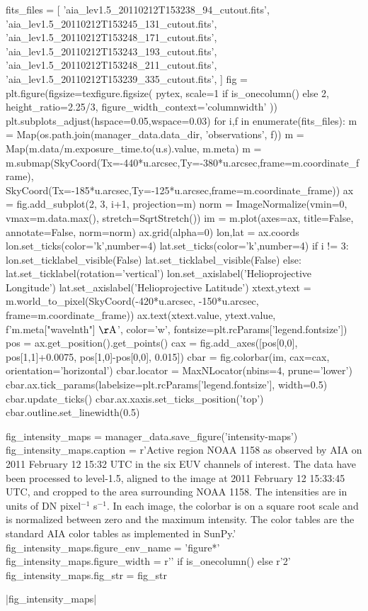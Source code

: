 \begin{pycode}
fits_files = [
    'aia_lev1.5_20110212T153238_94_cutout.fits',
    'aia_lev1.5_20110212T153245_131_cutout.fits',
    'aia_lev1.5_20110212T153248_171_cutout.fits',
    'aia_lev1.5_20110212T153243_193_cutout.fits',
    'aia_lev1.5_20110212T153248_211_cutout.fits',
    'aia_lev1.5_20110212T153239_335_cutout.fits',
]
fig = plt.figure(figsize=texfigure.figsize(
    pytex,
    scale=1 if is_onecolumn() else 2,
    height_ratio=2.25/3,
    figure_width_context='columnwidth'
))
plt.subplots_adjust(hspace=0.05,wspace=0.03)
for i,f in enumerate(fits_files):
    m = Map(os.path.join(manager_data.data_dir, 'observations', f))
    m = Map(m.data/m.exposure_time.to(u.s).value, m.meta)
    m = m.submap(SkyCoord(Tx=-440*u.arcsec,Ty=-380*u.arcsec,frame=m.coordinate_frame),
                 SkyCoord(Tx=-185*u.arcsec,Ty=-125*u.arcsec,frame=m.coordinate_frame))
    ax = fig.add_subplot(2, 3, i+1, projection=m)
    norm = ImageNormalize(vmin=0, vmax=m.data.max(), stretch=SqrtStretch())
    im = m.plot(axes=ax, title=False, annotate=False, norm=norm)
    ax.grid(alpha=0)
    lon,lat = ax.coords
    lon.set_ticks(color='k',number=4)
    lat.set_ticks(color='k',number=4)
    if i != 3:
        lon.set_ticklabel_visible(False)
        lat.set_ticklabel_visible(False)
    else:
        lat.set_ticklabel(rotation='vertical')
        lon.set_axislabel('Helioprojective Longitude')
        lat.set_axislabel('Helioprojective Latitude')
    xtext,ytext = m.world_to_pixel(SkyCoord(-420*u.arcsec, -150*u.arcsec, frame=m.coordinate_frame))
    ax.text(xtext.value,
            ytext.value,
            f'{m.meta["wavelnth"]} $\mathrm{{\AA}}$',
            color='w',
            fontsize=plt.rcParams['legend.fontsize'])
    pos = ax.get_position().get_points()
    cax = fig.add_axes([pos[0,0], pos[1,1]+0.0075, pos[1,0]-pos[0,0], 0.015])
    cbar = fig.colorbar(im, cax=cax, orientation='horizontal')
    cbar.locator = MaxNLocator(nbins=4, prune='lower')
    cbar.ax.tick_params(labelsize=plt.rcParams['legend.fontsize'], width=0.5)
    cbar.update_ticks()
    cbar.ax.xaxis.set_ticks_position('top')
    cbar.outline.set_linewidth(0.5)

fig_intensity_maps = manager_data.save_figure('intensity-maps')
fig_intensity_maps.caption = r'Active region NOAA 1158 as observed by AIA on 2011 February 12 15:32 UTC in the six EUV channels of interest. The data have been processed to level-1.5, aligned to the image at 2011 February 12 15:33:45 UTC, and cropped to the area surrounding NOAA 1158. The intensities are in units of DN pixel$^{-1}$ s$^{-1}$. In each image, the colorbar is on a square root scale and is normalized between zero and the maximum intensity. The color tables are the standard AIA color tables as implemented in SunPy.'
fig_intensity_maps.figure_env_name = 'figure*'
fig_intensity_maps.figure_width = r'\columnwidth' if is_onecolumn() else r'2\columnwidth'
fig_intensity_maps.fig_str = fig_str
\end{pycode}
|fig_intensity_maps|


